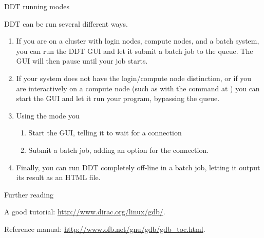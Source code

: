 
 {DDT running modes}

DDT can be run several different ways.
\begin{enumerate}
\item If you are on a cluster with login nodes, compute nodes, and a batch system,
  you can run the DDT \ac{GUI} and let it submit a batch job to the queue.
  The \ac{GUI} will then pause until your job starts.
\item If your system does not have the login/compute node distinction,
  or if you are interactively on a compute node
  (such as with the  command at )
  you can start the \ac{GUI} and let it run your program,
  bypassing the queue.
\item Using the  mode you
  \begin{enumerate}
  \item Start the GUI, telling it to wait for a connection
  \item Submit a batch job, adding an option for the connection.
  \end{enumerate}
\item Finally, you can run DDT completely off-line in a batch job, letting
  it output its result as an HTML file.
\end{enumerate}



 {Further reading}

A good tutorial: \url{http://www.dirac.org/linux/gdb/}.

Reference manual: \url{http://www.ofb.net/gnu/gdb/gdb_toc.html}.

